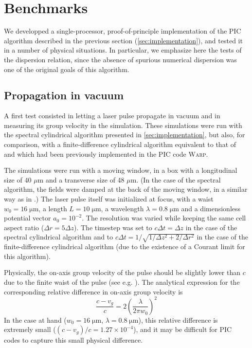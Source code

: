 \documentclass[a4paper]{article}   	%
\begin{document}
\section{Benchmarks}
\label{sec:benchmarks}

We developped a single-processor, proof-of-principle implementation of
the PIC algorithm described in the previous section (\cref{sec:implementation}), and tested
it in a number of physical situations. In particular, we emphasize
here the tests of the dispersion relation, since the absence of
spurious numerical dispersion was one of the original goals of this algorithm.

\subsection{Propagation in vacuum}
\label{sec:vacuum_vg}

A first test consisted in letting a laser pulse propagate in vacuum and in
measuring its group velocity in the simulation. These simulations were
run with the spectral cylindrical algorithm presented in
\cref{sec:implementation}, but also, for comparison, with a finite-difference cylindrical
algorithm equivalent to that of \cite{Lifschitz,Davidson} and which had
been previously implemented in the PIC code \textsc{Warp}.

The simulations were run with a moving window, in a box with a
longitudinal size of 40 $\mu$m and a transverse size of 48 $\mu$m. (In
the case of the spectral algorithm, the fields were damped at the back
of the moving window, in a similar way as in \citep{YuIPAC2015}.)
The laser pulse itself was initialized at focus, with a waist 
$w_0 = 16 \;\mathrm{\mu m}$, a length $L = 10 \; \mathrm{\mu m}$,
a wavelength $\lambda = 0.8 \; \mathrm{\mu m}$ and a 
dimensionless potential vector $a_0 = 10^{-2}$.
The resolution was varied while keeping the same cell aspect ratio ($\Delta r = 5\Delta z$). The
timestep was set to $c\Delta t = \Delta z$ in the case of the spectral
cylindrical algorithm and to $c\Delta t = 1/\sqrt{1/\Delta z^2 +
  2/\Delta r^2}$ in the case of the finite-difference
cylindrical algorithm (due to the existence of a Courant
limit for this algorithm). 

Physically, the on-axis group velocity of the pulse should be slightly lower than $c$ due
to the finite waist of the pulse (see e.g. \citet{Esarey1999}). The
analytical expression for the corresponding relative
difference in on-axis group velocity is
\begin{equation} 
\label{eq:vacuum_vg}
\frac{c-v_g}{c} = 2\left( \frac{\lambda}{2\pi w_0} \right)^2
\end{equation}
\noindent In the case at hand ($w_0=16\;\mathrm{\mu m}$,
$\lambda=0.8\;\mathrm{\mu m}$), this relative difference is extremely
small ($(c-v_g)/c = 1.27 \times 10^{-4}$), and it may be difficult for
PIC codes to capture this small physical difference. 
\end{document}
